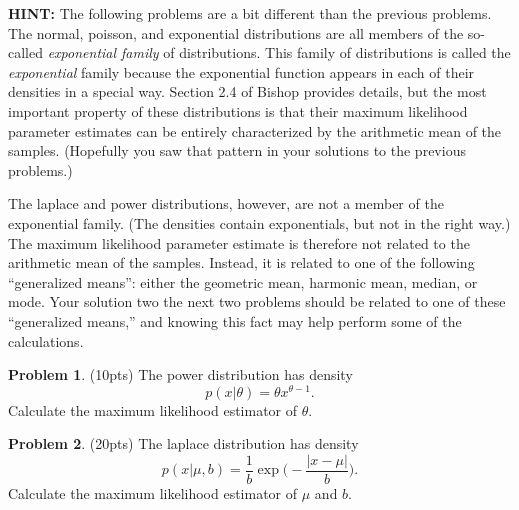 \documentclass[10pt]{article}
\theoremstyle{definition}
\newtheorem{problem}{Problem}
\begin{document}
\newpage
\noindent
\textbf{HINT:}
The following problems are a bit different than the previous problems.
The normal, poisson, and exponential distributions are all members of the so-called \emph{exponential family} of distributions.
This family of distributions is called the \emph{exponential} family because the exponential function appears in each of their densities in a special way.
Section 2.4 of Bishop provides details,
but the most important property of these distributions is that their maximum likelihood parameter estimates can be entirely characterized by the arithmetic mean of the samples.
(Hopefully you saw that pattern in your solutions to the previous problems.)

The laplace and power distributions, however, are not a member of the exponential family.
(The densities contain exponentials, but not in the right way.)
The maximum likelihood parameter estimate is therefore not related to the arithmetic mean of the samples.
Instead, it is related to one of the following ``generalized means'': either the geometric mean, harmonic mean, median, or mode.
Your solution two the next two problems should be related to one of these ``generalized means,''
and knowing this fact may help perform some of the calculations.

\begin{problem}
    (10pts) 
    The power distribution has density
    \begin{equation}
        p(x|\theta) = \theta x^{\theta-1}
        .
    \end{equation}
    Calculate the maximum likelihood estimator of $\theta$.
\end{problem}

\newpage
\begin{problem}
    (20pts) 
    The laplace distribution has density
    \begin{equation}
        p(x|\mu,b) = \frac1b \exp\bigg(-\frac{|x-\mu|}{b}\bigg)
        .
    \end{equation}
    Calculate the maximum likelihood estimator of $\mu$ and $b$.
\end{problem}
\end{document}
